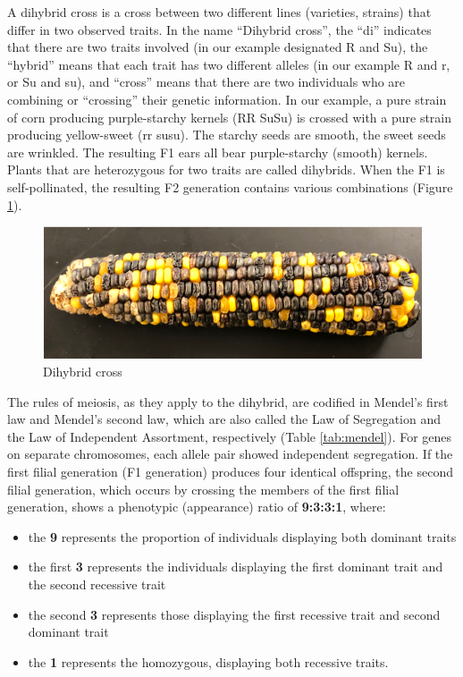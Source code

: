 A dihybrid cross is a cross between two different lines (varieties, strains) that differ in two observed traits. In the name ``Dihybrid cross'', the ``di'' indicates that there are two traits involved (in our example designated R and Su), the ``hybrid'' means that each trait has two different alleles (in our example R and r, or Su and su), and ``cross'' means that there are two individuals who are combining or ``crossing'' their genetic information. In our example, a pure strain of corn producing purple-starchy kernels (RR SuSu) is crossed with a pure strain producing yellow-sweet (rr susu). The starchy seeds are smooth, the sweet seeds are wrinkled. The resulting F1 ears all bear purple-starchy (smooth) kernels. Plants that are heterozygous for two traits are called dihybrids. When the F1 is self-pollinated, the resulting F2 generation contains various combinations (Figure \ref{fig:dihybrid}).

\begin{figure}

{\centering \includegraphics[width=0.7\linewidth]{./figures/mendel/Dihybrid_cross} 

}

\caption{Dihybrid cross}\label{fig:dihybrid}
\end{figure}

The rules of meiosis, as they apply to the dihybrid, are codified in Mendel's first law and Mendel's second law, which are also called the Law of Segregation and the Law of Independent Assortment, respectively (Table \ref{tab:mendel}). For genes on separate chromosomes, each allele pair showed independent segregation. If the first filial generation (F1 generation) produces four identical offspring, the second filial generation, which occurs by crossing the members of the first filial generation, shows a phenotypic (appearance) ratio of \textbf{9:3:3:1}, where:

\begin{itemize}
\tightlist
\item
  the \textbf{9} represents the proportion of individuals displaying both dominant traits
\item
  the first \textbf{3} represents the individuals displaying the first dominant trait and the second recessive trait
\item
  the second \textbf{3} represents those displaying the first recessive trait and second dominant trait
\item
  the \textbf{1} represents the homozygous, displaying both recessive traits.
\end{itemize}


